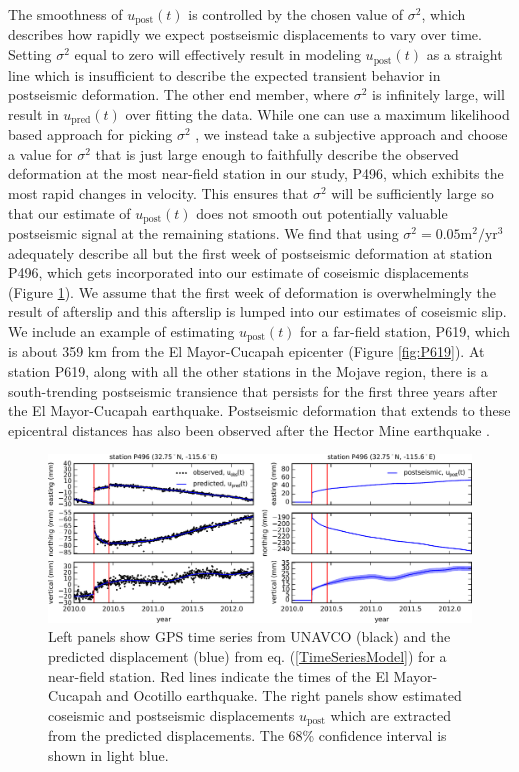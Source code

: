 \documentclass[draft,linenumbers]{AGUJournal}
\begin{document}
The smoothness of $u_\mathrm{post}(t)$ is controlled by the chosen value of $\sigma^2$, which describes how rapidly we expect postseismic displacements to vary over time.  Setting $\sigma^2$ equal to zero will effectively result in modeling $u_\mathrm{post}(t)$ as a straight line which is insufficient to describe the expected transient behavior in postseismic deformation. The other end member, where $\sigma^2$ is infinitely large, will result in $u_\mathrm{pred}(t)$ over fitting the data. While one can use a maximum likelihood based approach for picking $\sigma^2$ \citep[e.g.][]{Segall1997}, we instead take a subjective approach and choose a value for $\sigma^2$ that is just large enough to faithfully describe the observed deformation at the most near-field station in our study, P496, which exhibits the most rapid changes in velocity. This ensures that $\sigma^2$ will be sufficiently large so that our estimate of $u_\mathrm{post}(t)$ does not smooth out potentially valuable postseismic signal at the remaining stations. We find that using $\sigma^2 = 0.05 \mathrm{m}^2 / \mathrm{yr}^3$ adequately describe all but the first week of postseismic deformation at station P496, which gets incorporated into our estimate of coseismic displacements (Figure \ref{fig:P496}).  We assume that the first week of deformation is overwhelmingly the result of afterslip and this afterslip is lumped into our estimates of coseismic slip.  We include an example of estimating $u_\mathrm{post}(t)$ for a far-field station, P619, which is about 359 km from the El Mayor-Cucapah epicenter (Figure \ref{fig:P619}).  At station P619, along with all the other stations in the Mojave region, there is a south-trending postseismic transience that persists for the first three years after the El Mayor-Cucapah earthquake.  Postseismic deformation that extends to these epicentral distances has also been observed after the Hector Mine earthquake \citep{Freed2007a}.

\begin{figure}
\includegraphics[scale=0.9]{Figures/FilterP496}
\centering
\caption{Left panels show GPS time series from UNAVCO (black) and the predicted displacement (blue) from eq. (\ref{TimeSeriesModel}) for a near-field station.  Red lines indicate the times of the El Mayor-Cucapah and Ocotillo earthquake. The right panels show estimated coseismic and postseismic displacements $u_\mathrm{post}$ which are extracted from the predicted displacements.  The 68\% confidence interval is shown in light blue.}
\label{fig:P496}
\end{figure}
\end{document}
